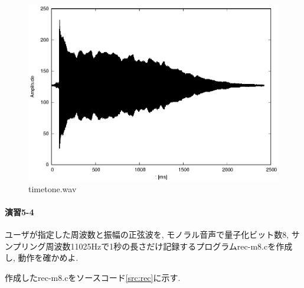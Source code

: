 \documentclass[titlepage]{jsarticle}
\begin{document}
        \begin{figure}[ht]
            \centering
            \includegraphics[width=12cm]{images/timetone.eps}
            \caption{timetone.wav}
            \label{fig:timetone}
        \end{figure}

    \paragraph{演習5-4} ユーザが指定した周波数と振幅の正弦波を, モノラル音声で量子化ビット数8,
    サンプリング周波数11025Hzで1秒の長さだけ記録するプログラムrec-m8.cを作成し, 動作を確かめよ.

        作成したrec-m8.cをソースコード\ref{src:rec}に示す.
\end{document}
